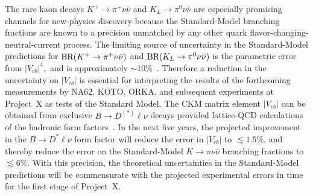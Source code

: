 \begin{itemize}
The rare kaon decays $K^+ \to \pi^+ \nu \bar{\nu}$ and $K_L \to \pi^0 \nu
\bar{\nu}$ are especially promising channels for new-physics discovery because
the Standard-Model branching fractions are known to a precision unmatched by
any other quark flavor-changing-neutral-current process.  The limiting source
of uncertainty in the Standard-Model predictions for $\mbox{\rm BR}(K^+ \to \pi^+ \nu
\bar{\nu})$ and $\mbox{\rm BR}(K_L \to \pi^0 \nu \bar{\nu})$ is the parametric error
from $|V_{cb}|^4,$ and is approximately $\sim$10\%~\cite{Brod:2010hi}.
Therefore a reduction in the uncertainty on $|V_{cb}|$ is essential for
interpreting the results of the forthcoming measurements by NA62, KOTO, ORKA,
and subsequent experiments at Project~X as tests of the Standard Model.  The
CKM matrix element $|V_{cb}|$ can be obtained from exclusive $B \to D^{(*)}
\ell\nu$ decays provided lattice-QCD calculations of the hadronic form
factors~\cite{Bailey:2010gb}.  In the next five years, the projected
improvement in the $B\to D^* \ell\nu$ form factor will reduce the error in
$|V_{cb}|$ to $\lesssim 1.5\%$, and thereby reduce the error on the
Standard-Model $K\to\pi\nu\bar{\nu}$ branching fractions to $\lesssim 6$\%.
With this precision, the theoretical uncertainties in the Standard-Model
predictions will be commensurate with the projected experimental errors in
time for the first stage of Project~X.


\end{itemize}
